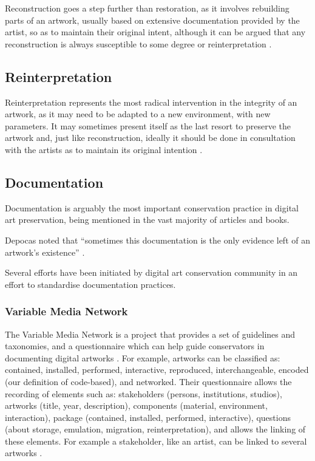 Reconstruction goes a step further than restoration, as it involves rebuilding parts of an artwork, usually based on extensive documentation provided by the artist, so as to maintain their original intent, although it can be argued that any reconstruction is always susceptible to some degree or reinterpretation \cite{huberNewMediaOld2013}.


\subsection{Reinterpretation}

Reinterpretation represents the most radical intervention in the integrity of an artwork, as it may need to be adapted to a new environment, with new parameters. It may sometimes present itself as the last resort to preserve the artwork and, just like reconstruction, ideally it should be done in consultation with the artists as to maintain its original intention \cite{serexheDigitalArtConservation2013}.


\subsection{Documentation}

Documentation is arguably the most important conservation practice in digital art preservation, being mentioned in the vast majority of articles and books.

Depocas noted that ``sometimes this documentation is the only evidence left of an artwork's existence'' \citeyear[p.145]{depocasDocumentingConservingTechnological2013}.

Several efforts have been initiated by digital art conservation community in an effort to standardise documentation practices.

\subsubsection{Variable Media Network}

The Variable Media Network is a project that provides a set of guidelines and taxonomies, and a questionnaire which can help guide conservators in documenting digital artworks \cite{depocasPermanenceChangeVariable2003}. For example, artworks can be classified as: contained, installed, performed, interactive, reproduced, interchangeable, encoded (our definition of code-based), and networked. Their questionnaire allows the recording of elements such as: stakeholders (persons, institutions, studios), artworks (title, year, description), components (material, environment, interaction), package (contained, installed, performed, interactive), questions (about storage, emulation, migration, reinterpretation), and allows the linking of these elements. For example a stakeholder, like an artist, can be linked to several artworks \cite{VariableMediaNetwork}.


